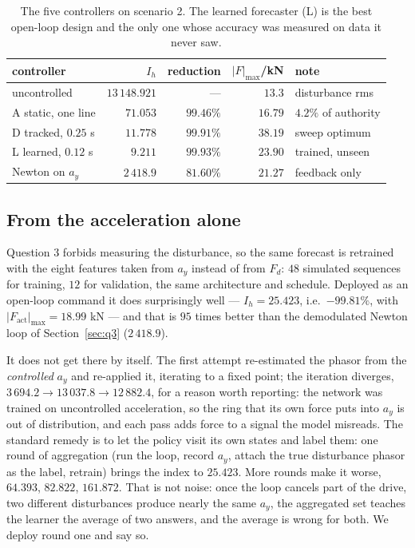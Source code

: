 \documentclass[12pt]{apmcmthesis}
\begin{document}
\begin{table}[htbp]\centering\small
\caption{The five controllers on scenario 2. The learned forecaster (L) is the best open-loop
design and the only one whose accuracy was measured on data it never saw.}
\label{tab:learn}
\begin{tabular}{lrrrl}
\hline
controller & $I_h$ & reduction & $|F|_{\max}$/kN & note \\
\hline
uncontrolled & $13\,148.921$ & --- & $13.3$ & disturbance rms \\
A static, one line & $71.053$ & $99.46\%$ & $16.79$ & $4.2\%$ of authority \\
D tracked, $0.25$ s & $11.778$ & $99.91\%$ & $38.19$ & sweep optimum \\
L learned, $0.12$ s & $\mathbf{9.211}$ & $\mathbf{99.93\%}$ & $23.90$ & trained, unseen \\
Newton on $a_y$ & $2\,418.9$ & $81.60\%$ & $21.27$ & feedback only \\
\hline
\end{tabular}
\end{table}

\subsection{From the acceleration alone}
Question 3 forbids measuring the disturbance, so the same forecast is retrained with the eight
features taken from $a_y$ instead of from $F_d$: $48$ simulated sequences for training, $12$ for
validation, the same architecture and schedule. Deployed as an open-loop command it does
surprisingly well --- $I_h=25.423$, i.e.\ $-99.81\%$, with $|F_{\text{act}}|_{\max}=18.99$ kN --- and
that is $95$ times better than the demodulated Newton loop of Section~\ref{sec:q3} ($2\,418.9$).

It does not get there by itself. The first attempt re-estimated the phasor from the \emph{controlled}
$a_y$ and re-applied it, iterating to a fixed point; the iteration diverges,
$3\,694.2\to13\,037.8\to12\,882.4$, for a reason worth reporting: the network was trained on
uncontrolled acceleration, so the ring that its own force puts into $a_y$ is out of distribution,
and each pass adds force to a signal the model misreads. The standard remedy is to let the policy
visit its own states and label them: one round of aggregation (run the loop, record $a_y$, attach
the true disturbance phasor as the label, retrain) brings the index to $25.423$. More rounds make it
worse, $64.393$, $82.822$, $161.872$. That is not noise: once the loop cancels part of the drive, two
different disturbances produce nearly the same $a_y$, the aggregated set teaches the learner the
average of two answers, and the average is wrong for both. We deploy round one and say so.
\end{document}
